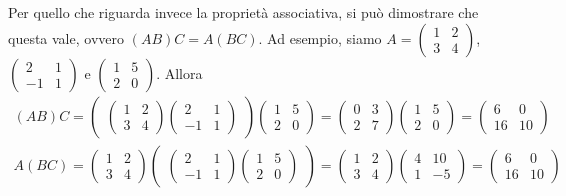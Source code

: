 \documentclass{book}
\begin{document}
Per quello che riguarda invece la proprietà associativa, si può dimostrare che questa vale,
ovvero $(AB)C=A(BC)$. Ad esempio, siamo $A=
\begin{pmatrix}
  1 &2 \\
  3 &4
\end{pmatrix}
$,
$\begin{pmatrix}
   2 & 1\\
   -1 & 1
\end{pmatrix}$ e
$\begin{pmatrix}
   1 &5 \\
   2 &0
\end{pmatrix}$. Allora
\begin{eqnarray*}
  (AB)C=
  \begin{pmatrix}
    \begin{pmatrix}
      1 &2\\
      3 &4
    \end{pmatrix}
    \begin{pmatrix}
      2 & 1\\
      -1 & 1
    \end{pmatrix}
  \end{pmatrix}
  \begin{pmatrix}
    1 &5\\
    2 &0
  \end{pmatrix}=
  \begin{pmatrix}
    0& 3\\
    2 &7 
  \end{pmatrix}
  \begin{pmatrix}
    1 & 5\\
    2 &0
  \end{pmatrix}=
  \begin{pmatrix}
    6 &0\\
    16 & 10
  \end{pmatrix}\\
  A(BC)=
  \begin{pmatrix}
    1 &2 \\
    3 &4
  \end{pmatrix}
  \begin{pmatrix}
     \begin{pmatrix}
      2 & 1\\
      -1 & 1
    \end{pmatrix}
    \begin{pmatrix}
      1 &5\\
      2 &0
    \end{pmatrix}  
  \end{pmatrix}=
  \begin{pmatrix}
    1 &2 \\
    3 &4
  \end{pmatrix}
  \begin{pmatrix}
    4 &10\\
    1 & -5
  \end{pmatrix}=
  \begin{pmatrix}
    6 &0\\
    16 & 10
  \end{pmatrix}
\end{eqnarray*}
\end{document}
